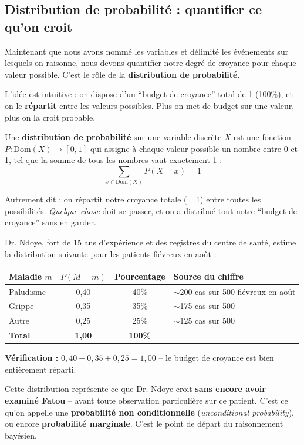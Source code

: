 \documentclass[11pt,a4paper]{article}
\newcommand{\cmark}{\ding{51}}
\begin{document}
\subsection{Distribution de probabilité : quantifier ce qu'on croit}

Maintenant que nous avons nommé les variables et délimité les événements sur lesquels on raisonne, nous devons quantifier notre degré de croyance pour chaque valeur possible. C'est le rôle de la \textbf{distribution de probabilité}.

L'idée est intuitive : on dispose d'un ``budget de croyance'' total de 1 (100\%), et on le \textbf{répartit} entre les valeurs possibles. Plus on met de budget sur une valeur, plus on la croit probable.

\begin{definitionbox}
Une \textbf{distribution de probabilité} sur une variable discrète $X$ est une fonction $P : \text{Dom}(X) \to [0,1]$ qui assigne à chaque valeur possible un nombre entre 0 et 1, tel que la somme de tous les nombres vaut exactement 1 :
$$\sum_{x \in \text{Dom}(X)} P(X = x) = 1$$

Autrement dit  : on répartit notre croyance totale (= 1) entre toutes les possibilités. \textit{Quelque chose} doit se passer, et on a distribué tout notre ``budget de croyance'' sans en garder.
\end{definitionbox}

\begin{exemplebox}
Dr. Ndoye, fort de 15 ans d'expérience et des registres du centre de santé, estime la distribution suivante pour les patients fiévreux en août :

\begin{center}
\begin{tabular}{lccl}
\toprule
\textbf{Maladie} $m$ & $P(M = m)$ & \textbf{Pourcentage} & \textbf{Source du chiffre} \\
\midrule
Paludisme & 0,40 & 40\% & $\sim$200 cas sur 500 fiévreux en août \\
Grippe & 0,35 & 35\% & $\sim$175 cas sur 500 \\
Autre & 0,25 & 25\% & $\sim$125 cas sur 500 \\
\midrule
\textbf{Total} & \textbf{1,00} & \textbf{100\%} & \\
\bottomrule
\end{tabular}
\end{center}

\textbf{Vérification :} $0{,}40 + 0{,}35 + 0{,}25 = 1{,}00$ \cmark{} -- le budget de croyance est bien entièrement réparti.

Cette distribution représente ce que Dr. Ndoye croit \textbf{sans encore avoir examiné Fatou} -- avant toute observation particulière sur ce patient. C'est ce qu'on appelle une \textbf{probabilité non conditionnelle} (\textit{unconditional probability}), ou encore \textbf{probabilité marginale}. C'est le point de départ du raisonnement bayésien.
\end{exemplebox}
\end{document}
